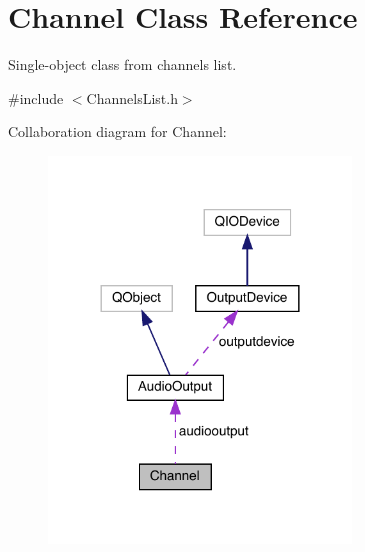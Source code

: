 \hypertarget{class_channel}{}\section{Channel Class Reference}
\label{class_channel}


Single-\/object class from channels list.  




{\ttfamily \#include $<$Channels\+List.\+h$>$}



Collaboration diagram for Channel\+:
\nopagebreak
\begin{figure}[H]
\begin{center}
\leavevmode
\includegraphics[width=228pt]{class_channel__coll__graph}
\end{center}
\end{figure}

